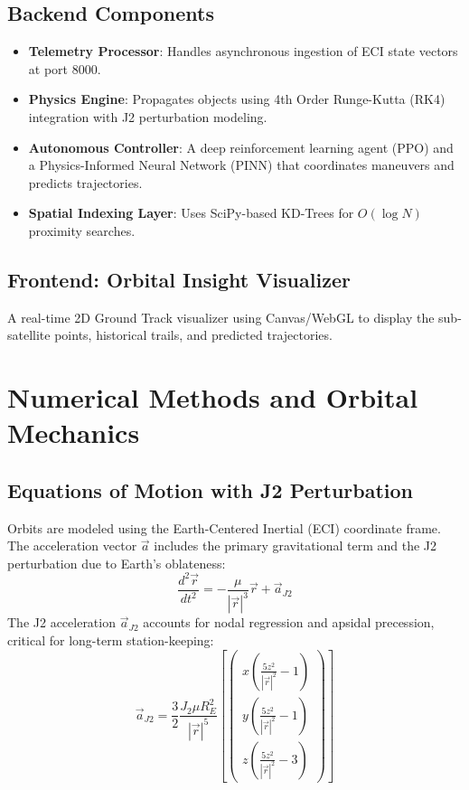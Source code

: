 \documentclass[11pt,a4paper]{article}
\begin{document}
\subsection{Backend Components}
\begin{itemize}
    \item \textbf{Telemetry Processor}: Handles asynchronous ingestion of ECI state vectors at port 8000.
    \item \textbf{Physics Engine}: Propagates objects using 4th Order Runge-Kutta (RK4) integration with J2 perturbation modeling.
    \item \textbf{Autonomous Controller}: A deep reinforcement learning agent (PPO) and a Physics-Informed Neural Network (PINN) that coordinates maneuvers and predicts trajectories.
    \item \textbf{Spatial Indexing Layer}: Uses SciPy-based KD-Trees for $O(\log N)$ proximity searches.
\end{itemize}

\subsection{Frontend: Orbital Insight Visualizer}
A real-time 2D Ground Track visualizer using Canvas/WebGL to display the sub-satellite points, historical trails, and predicted trajectories.

\section{Numerical Methods and Orbital Mechanics}
\label{sec:physics}

\subsection{Equations of Motion with J2 Perturbation}
Orbits are modeled using the Earth-Centered Inertial (ECI) coordinate frame. The acceleration vector $\vec{a}$ includes the primary gravitational term and the J2 perturbation due to Earth's oblateness:
\begin{equation}
    \frac{d^2\vec{r}}{dt^2} = -\frac{\mu}{|\vec{r}|^3}\vec{r} + \vec{a}_{J2}
\end{equation}
The J2 acceleration $\vec{a}_{J2}$ accounts for nodal regression and apsidal precession, critical for long-term station-keeping:
\begin{equation}
    \vec{a}_{J2} = \frac{3}{2} \frac{J_2 \mu R_E^2}{|\vec{r}|^5} \left[ \begin{pmatrix} x(\frac{5z^2}{|\vec{r}|^2} - 1) \\ y(\frac{5z^2}{|\vec{r}|^2} - 1) \\ z(\frac{5z^2}{|\vec{r}|^2} - 3) \end{pmatrix} \right]
\end{equation}
\end{document}
